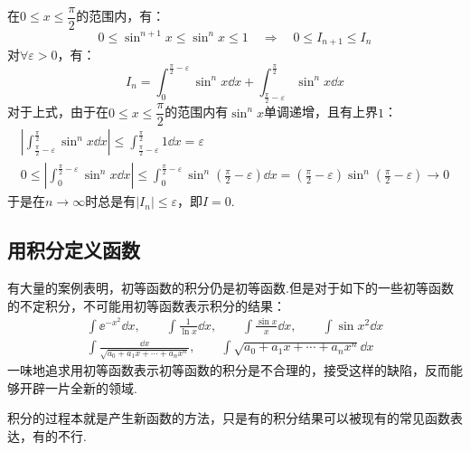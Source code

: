 \begin{solution}
    在$0\leqslant x \leqslant \dfrac{\pi}{2}$的范围内，有：
    \[0 \leqslant \sin^{n+1} x \leqslant \sin^n x \leqslant 1 \quad\Rightarrow\quad 0 \leqslant I_{n+1} \leqslant I_n\]
    对$\forall\varepsilon>0$，有：
    \[I_n = \int_{0}^{\frac{\pi}{2}-\varepsilon}\sin^n x\dd{x} + \int_{\frac{\pi}{2}-\varepsilon}^{\frac{\pi}{2}}\sin^n x\dd{x}\]
    对于上式，由于在$0\leqslant x \leqslant \dfrac{\pi}{2}$的范围内有$\sin^n x$单调递增，且有上界$1$：
    \begin{gather*}
        \left|\int_{\frac{\pi}{2}-\varepsilon}^{\frac{\pi}{2}}\sin^n x\dd{x}\right| \leqslant \int_{\frac{\pi}{2}-\varepsilon}^{\frac{\pi}{2}} 1 \dd{x} = \varepsilon\\
        0 \leqslant \left|\int_{0}^{\frac{\pi}{2}-\varepsilon}\sin^n x\dd{x}\right| \leqslant \int_{0}^{\frac{\pi}{2}-\varepsilon}\sin^n\left(\frac{\pi}{2}-\varepsilon\right)\dd{x} = \left(\frac{\pi}{2}-\varepsilon\right)\sin^n\left(\frac{\pi}{2}-\varepsilon\right) \to 0
    \end{gather*}
    于是在$n\to\infty$时总是有$|I_n|\leqslant \varepsilon$，即$I = 0$.
\end{solution}


\subsection{用积分定义函数}
有大量的案例表明，初等函数的积分仍是初等函数.但是对于如下的一些初等函数的不定积分，不可能用初等函数表示积分的结果：
\begin{gather*}
    \int\ee^{-x^2}\dd{x},\qquad \int\frac{1}{\ln x}\dd{x},\qquad \int\frac{\sin x}{x}\dd{x},\qquad \int\sin x^2\dd{x}\\
    \int\frac{\dd{x}}{\sqrt{a_0+a_1x+\cdots+a_n x^n}},\qquad \int\sqrt{a_0+a_1x+\cdots+a_n x^n}\dd{x}
\end{gather*}
一味地追求用初等函数表示初等函数的积分是不合理的，接受这样的缺陷，反而能够开辟一片全新的领域.

积分的过程本就是产生新函数的方法，只是有的积分结果可以被现有的常见函数表达，有的不行.

